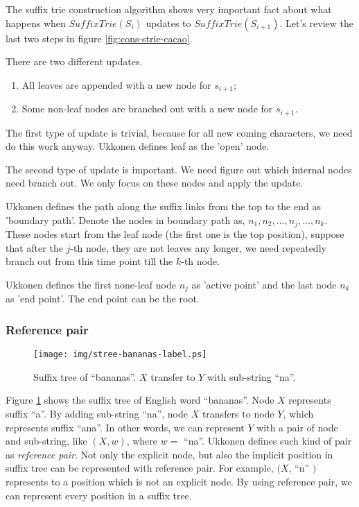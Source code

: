 \documentclass{article}
\begin{document}
The suffix trie construction algorithm shows very
important fact about what happens when $SuffixTrie(S_i)$ updates to
$SuffixTrie(S_{i+1})$. Let's review the last two steps in figure
\ref{fig:cons-strie-cacao}.

There are two different updates.
\begin{enumerate}
\item All leaves are appended with a new node for $s_{i+1}$;
\item Some non-leaf nodes are branched out with a new node for $s_{i+1}$.
\end{enumerate}

The first type of update is trivial, because for all new coming characters,
we need do this work anyway. Ukkonen defines leaf as the 'open' node.

The second type of update is important. We need figure out which internal
nodes need branch out. We only focus on these nodes and apply the
update.

Ukkonen defines the path along the suffix links from the top to the end
as 'boundary path'.
Denote the nodes in boundary path  as, $n_1, n_2, ..., n_j, ..., n_k$.
These nodes start from the leaf node (the first one is the top position),
suppose that after the $j$-th node, they are not leaves any longer,
we need repeatedly branch out from this time point till the $k$-th node.

Ukkonen defines the first none-leaf node $n_j$ as 'active point' and the last
node $n_k$ as 'end point'. The end point can be the root.

\subsubsection{Reference pair}

\begin{figure}[htbp]
  \centering
  \texttt{[image: img/stree-bananas-label.ps]}
  \caption{Suffix tree of ``bananas''. $X$ transfer to $Y$ with sub-string ``na''.}
  \label{fig:stree-bananas-label}
\end{figure}

Figure \ref{fig:stree-bananas-label} shows the suffix tree of English word ``bananas''.
Node $X$ represents suffix ``a''. By adding sub-string ``na'', node $X$ transfers
to node $Y$, which represents suffix ``ana''.
In other words, we can
represent $Y$ with a pair of node and sub-string, like $(X, w)$, where $w=$ ``na''.
Ukkonen defines
such kind of pair as {\em reference pair}. Not only the explicit node, but also the
implicit position in suffix tree can be represented with reference pair. For example,
$(X$, ``n'' $)$ represents to a position which is not an explicit node. By using reference
pair, we can represent every position in a suffix tree.
\end{document}
